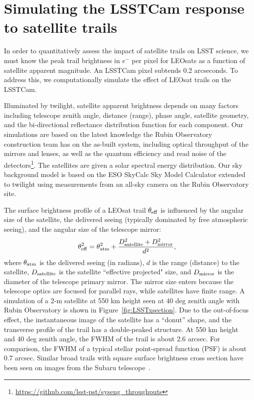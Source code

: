 \documentclass[twocolumn,trackchanges]{aastex63}
\begin{document}
 
\section{Simulating the LSSTCam response to satellite trails}
\label{sec:sim-cam-response}

In order to quantitatively assess the impact of satellite trails on LSST science, we must know the peak trail brightness in  $e^-$ per pixel for LEOsats as a function of satellite apparent magnitude. An LSSTCam pixel subtends 0.2 arcseconds. To address this, we computationally simulate the effect of LEOsat trails on the LSSTCam. 

Illuminated by twilight, satellite apparent brightness depends on many factors including telescope zenith angle, distance (range), phase angle, satellite geometry, and the bi-directional reflectance distribution function 
for each component.
Our simulations are based on the latest knowledge the Rubin Observatory construction team has on the as-built system, including optical throughput of the mirrors and lenses, as well as the quantum efficiency and read noise of the detectors\footnote{\url{https://github.com/lsst-pst/syseng_throughputs}}.
The satellites are given a solar spectral energy distribution.
Our sky background model \citep{2016SPIE.9910E..1AY} is based on the ESO SkyCalc Sky Model Calculator extended to twilight using measurements from an all-sky camera on the Rubin Observatory site.

The surface brightness profile of a LEOsat trail $\theta_{\rm eff}$ is influenced by the angular size of the satellite, the delivered seeing (typically dominated by free atmospheric seeing), and the angular size of the telescope mirror:
\begin{equation}\label{eq:satsize}
\theta^2_{\rm eff} = \theta^2_{\rm atm} + \frac{D^2_{\rm satellite} + D^2_{\rm mirror}}{d^2},
\end{equation}
where $\theta_{\rm atm}$ is the delivered seeing (in radians), $d$ is the range (distance) to the satellite, $D_{\rm satellite}$ is the satellite ``effective projected" size, and $D_{\rm mirror}$ is the diameter of the telescope primary mirror. The mirror size enters because the telescope optics are focused for parallel rays, while satellites have finite range. A simulation of a 2-m satellite at 550 km height seen at 40 deg zenith angle with Rubin Observatory is shown in Figure~\ref{fig:LSSTxsection}.
Due to the out-of-focus effect, the instantaneous image of the satellite has a ``donut'' shape, and the transverse profile of the trail has a double-peaked structure. At 550 km height and 40 deg zenith angle, the FWHM of the trail is about 2.6 arcsec. For comparison, the FWHM of a typical stellar point-spread function (PSF) is about 0.7 arcsec.  Similar broad trails with square surface brightness cross section have been seen on images from the Subaru telescope~\citep{2007PASJ...59..841I}.
\end{document}
